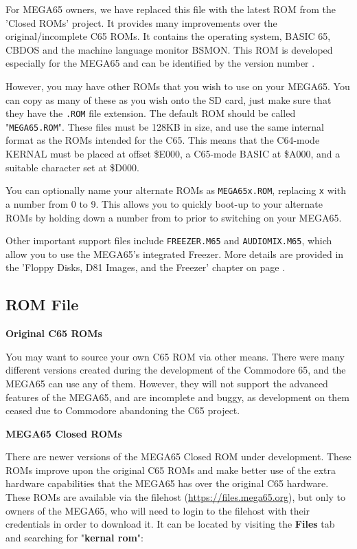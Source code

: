 For MEGA65 owners, we have replaced this file with the latest ROM from the 'Closed ROMs'
project. It provides many improvements over the original/incomplete C65 ROMs. It contains
the operating system, BASIC 65, CBDOS and the machine language monitor BSMON.
This ROM is developed especially for the MEGA65 and can be
identified by the version number .

However, you may have other ROMs that you wish to
use on your MEGA65.
You can copy as many of these as you wish onto the
SD card, just make sure that they have the {\tt .ROM} file extension.  The default ROM
should be called "{\tt MEGA65.ROM}". These files
must be 128KB in size, and use the same internal format as the ROMs
intended for the C65.  This means that the C64-mode KERNAL must be
placed at offset \$E000, a C65-mode BASIC at \$A000, and a suitable
character set at \$D000.

You can optionally name your alternate ROMs as {\tt MEGA65x.ROM}, replacing {\tt x} with a number from 0 to 9.
This allows you to quickly boot-up to your alternate ROMs by holding down a number from  to  prior
to switching on your MEGA65.

Other important support files include {\tt FREEZER.M65} and {\tt AUDIOMIX.M65}, which
allow you to use the MEGA65's integrated Freezer. More details are provided in the
'Floppy Disks, D81 Images, and the Freezer' chapter on page \pageref{cha:freezer}.

\subsection{ROM File}

\textbf{Original C65 ROMs}

You may want to source your own C65 ROM via other means.
There were many different versions created during the development of the Commodore 65,
and the MEGA65 can use any of them.  However, they will not support the advanced
features of the MEGA65, and are incomplete and buggy, as development on them ceased
due to Commodore abandoning the C65 project.

\textbf{MEGA65 Closed ROMs}

There are newer versions of the MEGA65 Closed ROM under development. These ROMs improve upon the original C65 ROMs and make better use of the extra hardware capabilities that the MEGA65 has over the original C65 hardware. These ROMs are available via the filehost (\url{https://files.mega65.org}), but only to owners of the MEGA65, who will need to login to the filehost with their credentials in order to download it. It can be located by visiting the \textbf{Files} tab and searching for "\textbf{kernal rom}":

